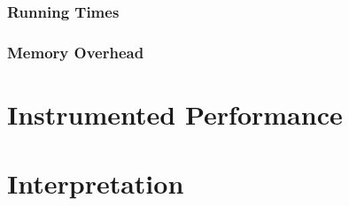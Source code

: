 \subsubsection{Running Times}


\subsubsection{Memory Overhead}


\section{Instrumented Performance}

\section{Interpretation}

